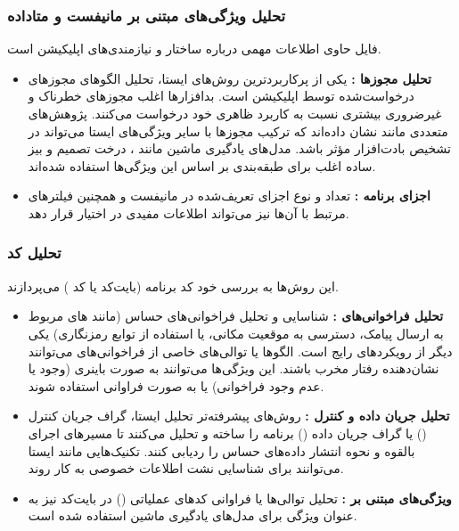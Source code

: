 \subsubsection{تحلیل ویژگی‌های مبتنی بر مانیفست و متاداده}
فایل  حاوی اطلاعات مهمی درباره ساختار و نیازمندی‌های اپلیکیشن است.
\begin{itemize}
    \item \textbf{تحلیل مجوزها :} یکی از پرکاربردترین روش‌های ایستا، تحلیل الگوهای مجوزهای درخواست‌شده توسط اپلیکیشن است. بدافزارها اغلب مجوزهای خطرناک و غیرضروری بیشتری نسبت به کاربرد ظاهری خود درخواست می‌کنند. پژوهش‌های متعددی مانند  \cite{Drebin} نشان داده‌اند که ترکیب مجوزها با سایر ویژگی‌های ایستا می‌تواند در تشخیص بادت‌افزار مؤثر باشد. مدل‌های یادگیری ماشین مانند ، درخت تصمیم و بیز ساده اغلب برای طبقه‌بندی بر اساس این ویژگی‌ها استفاده شده‌اند.
    \item \textbf{اجزای برنامه :} تعداد و نوع اجزای تعریف‌شده در مانیفست  و همچنین فیلترهای  مرتبط با آن‌ها نیز می‌تواند اطلاعات مفیدی در اختیار قرار دهد.
\end{itemize}

\subsubsection{تحلیل کد }
این روش‌ها به بررسی خود کد برنامه (بایت‌کد  یا کد ) می‌پردازند.
\begin{itemize}
    \item \textbf{تحلیل فراخوانی‌های :} شناسایی و تحلیل فراخوانی‌های  حساس (مانند های مربوط به ارسال پیامک، دسترسی به موقعیت مکانی، یا استفاده از توابع رمزنگاری) یکی دیگر از رویکردهای رایج است. الگوها یا توالی‌های خاصی از فراخوانی‌های  می‌توانند نشان‌دهنده رفتار مخرب باشند. این ویژگی‌ها می‌توانند به صورت باینری (وجود یا عدم وجود فراخوانی) یا به صورت فراوانی استفاده شوند.
    \item \textbf{تحلیل جریان داده و کنترل :} روش‌های پیشرفته‌تر تحلیل ایستا، گراف جریان کنترل () یا گراف جریان داده () برنامه را ساخته و تحلیل می‌کنند تا مسیرهای اجرای بالقوه و نحوه انتشار داده‌های حساس را ردیابی کنند. تکنیک‌هایی مانند  ایستا می‌توانند برای شناسایی نشت اطلاعات خصوصی به کار روند.
    \item \textbf{ویژگی‌های مبتنی بر :} تحلیل توالی‌ها یا فراوانی کدهای عملیاتی () در بایت‌کد نیز به عنوان ویژگی برای مدل‌های یادگیری ماشین استفاده شده است.
\end{itemize}

